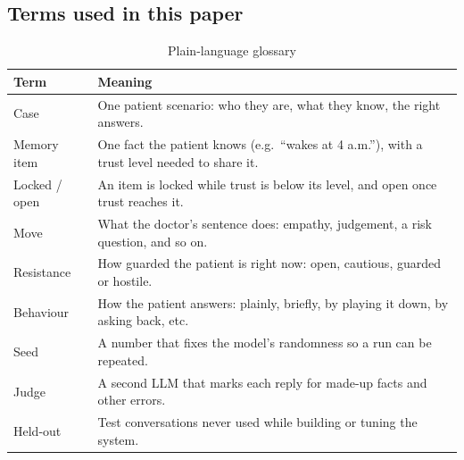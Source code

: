 \documentclass[manuscript, screen, review]{jair}
\begin{document}
\subsection{Terms used in this paper}
\begin{table}[h]
\caption{Plain-language glossary}
\label{tab:glossary}
\centering
\footnotesize
\begin{tabularx}{\columnwidth}{@{}lY@{}}
\toprule
Term & Meaning\\
\midrule
Case & One patient scenario: who they are, what they know, the right answers.\\
Memory item & One fact the patient knows (e.g.\ ``wakes at 4 a.m.''), with a trust level needed to share it.\\
Locked / open & An item is locked while trust is below its level, and open once trust reaches it.\\
Move & What the doctor's sentence does: empathy, judgement, a risk question, and so on.\\
Resistance & How guarded the patient is right now: open, cautious, guarded or hostile.\\
Behaviour & How the patient answers: plainly, briefly, by playing it down, by asking back, etc.\\
Seed & A number that fixes the model's randomness so a run can be repeated.\\
Judge & A second LLM that marks each reply for made-up facts and other errors.\\
Held-out & Test conversations never used while building or tuning the system.\\
\bottomrule
\end{tabularx}
\end{table}
\end{document}
